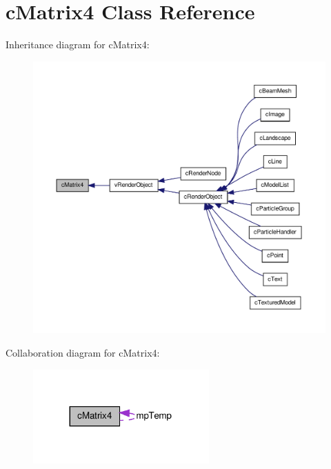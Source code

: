 \hypertarget{classc_matrix4}{
\section{cMatrix4 Class Reference}
\label{classc_matrix4}
}


Inheritance diagram for cMatrix4:
\nopagebreak
\begin{figure}[H]
\begin{center}
\leavevmode
\includegraphics[width=400pt]{classc_matrix4__inherit__graph}
\end{center}
\end{figure}


Collaboration diagram for cMatrix4:
\nopagebreak
\begin{figure}[H]
\begin{center}
\leavevmode
\includegraphics[width=191pt]{classc_matrix4__coll__graph}
\end{center}
\end{figure}
